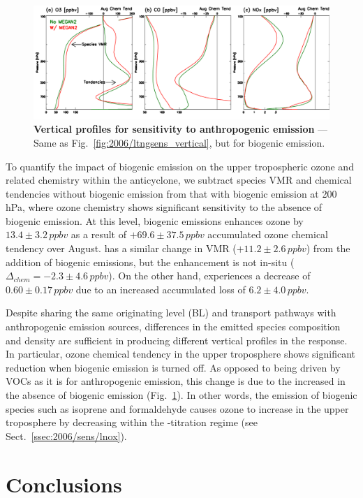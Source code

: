 	\begin{figure}[t!]
		\centering
		\includegraphics[width=1.0\textwidth]{sens/biosens_vert}
		\caption[Vertical profiles for sensitivity to anthropogenic emission]{\textbf{Vertical profiles for sensitivity to
		anthropogenic emission} --- Same as Fig.~\ref{fig:2006/ltngsens_vertical}, but for biogenic emission.
		\label{fig:2006/biosens_vert} }\vspace{-.3in}
	\end{figure}

To quantify the impact of biogenic emission on the upper tropospheric ozone and related chemistry within the anticyclone,
we subtract species VMR and chemical tendencies without biogenic emission from that with biogenic emission at
200\,\unit{hPa}, where ozone chemistry shows significant sensitivity to the absence of biogenic emission. At this level,
biogenic emissions enhances ozone by $13.4\pm3.2\,\unit{ppbv}$ as a result of $+69.6\pm37.5\,\unit{ppbv}$ accumulated
ozone chemical tendency over August.  has a similar change in VMR ($+11.2\pm2.6\,\unit{ppbv}$) from the
addition of biogenic emissions, but the enhancement is not in-situ ($\Delta_{chem}=-2.3\pm4.6\,\unit{ppbv}$). On the other
hand,  experiences a decrease of $0.60\pm0.17\,\unit{ppbv}$ due to an increased accumulated loss of
$6.2\pm4.0\,\unit{ppbv}$.

Despite sharing the same originating level (BL) and transport pathways with anthropogenic emission sources, differences
in the emitted species composition and density are sufficient in producing different vertical profiles in the response. In
particular, ozone chemical tendency in the upper troposphere shows significant reduction when biogenic emission is
turned off. As opposed to being driven by VOCs as it is for anthropogenic emission, this change is due to the increased
 in the absence of biogenic emission (Fig.~\ref{fig:2006/biosens_vert}). In other words, the emission of
biogenic species such as isoprene and formaldehyde causes ozone to increase in the upper troposphere by decreasing
 within the -titration regime (see Sect.~\ref{ssec:2006/sens/lnox}).


\section{Conclusions}\label{sec:2006/conslusion}